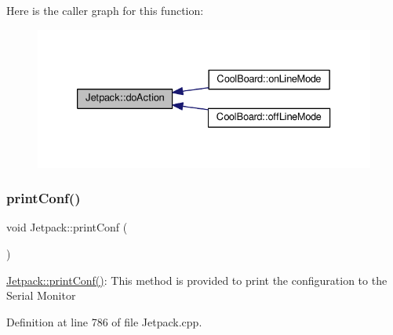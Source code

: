 Here is the caller graph for this function\+:\nopagebreak
\begin{figure}[H]
\begin{center}
\leavevmode
\includegraphics[width=333pt]{df/d1d/class_jetpack_a9e703197093094b963f9ad57817495b8_icgraph}
\end{center}
\end{figure}
\mbox{\label{class_jetpack_ac54a7bb4f9166bee32052253d9b1d306}} 
\subsubsection{\texorpdfstring{print\+Conf()}{printConf()}}
{\footnotesize\ttfamily void Jetpack\+::print\+Conf (\begin{DoxyParamCaption}{ }\end{DoxyParamCaption})}

\hyperlink{class_jetpack_ac54a7bb4f9166bee32052253d9b1d306}{Jetpack\+::print\+Conf()}\+: This method is provided to print the configuration to the Serial Monitor 

Definition at line 786 of file Jetpack.\+cpp.


